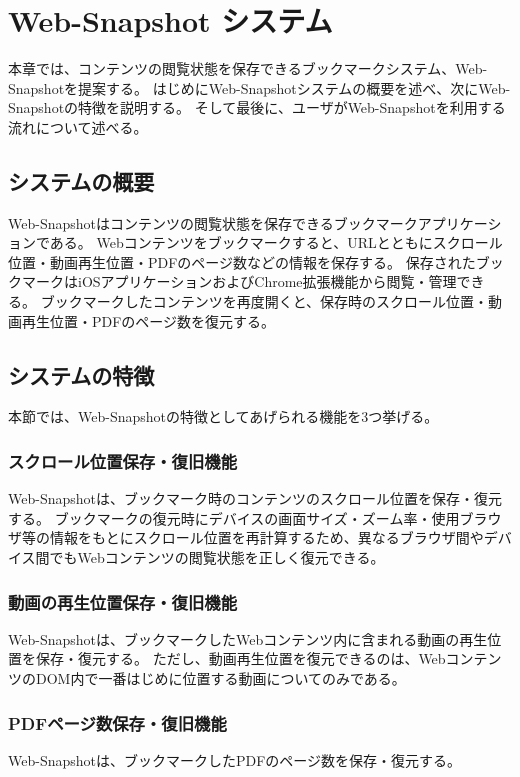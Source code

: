 \chapter{Web-Snapshot システム}
\label{chap:web_snapshot_system}
本章では、コンテンツの閲覧状態を保存できるブックマークシステム、Web-Snapshotを提案する。
はじめにWeb-Snapshotシステムの概要を述べ、次にWeb-Snapshotの特徴を説明する。
そして最後に、ユーザがWeb-Snapshotを利用する流れについて述べる。

\section{システムの概要}
Web-Snapshotはコンテンツの閲覧状態を保存できるブックマークアプリケーションである。
Webコンテンツをブックマークすると、URLとともにスクロール位置・動画再生位置・PDFのページ数などの情報を保存する。
保存されたブックマークはiOSアプリケーションおよびChrome拡張機能から閲覧・管理できる。
ブックマークしたコンテンツを再度開くと、保存時のスクロール位置・動画再生位置・PDFのページ数を復元する。

\section{システムの特徴}
本節では、Web-Snapshotの特徴としてあげられる機能を3つ挙げる。

\subsection{スクロール位置保存・復旧機能}
Web-Snapshotは、ブックマーク時のコンテンツのスクロール位置を保存・復元する。
ブックマークの復元時にデバイスの画面サイズ・ズーム率・使用ブラウザ等の情報をもとにスクロール位置を再計算するため、異なるブラウザ間やデバイス間でもWebコンテンツの閲覧状態を正しく復元できる。

\subsection{動画の再生位置保存・復旧機能}
Web-Snapshotは、ブックマークしたWebコンテンツ内に含まれる動画の再生位置を保存・復元する。
ただし、動画再生位置を復元できるのは、WebコンテンツのDOM内で一番はじめに位置する動画についてのみである。

\subsection{PDFページ数保存・復旧機能}
Web-Snapshotは、ブックマークしたPDFのページ数を保存・復元する。


